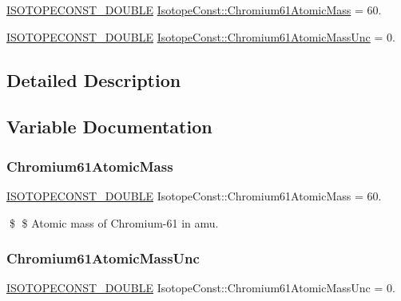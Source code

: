 \begin{DoxyCompactItemize}
\item 
\mbox{\hyperlink{group___isotope_const-_macros_ga8f45a7272ce02c0b4c65c44636ed719a}{I\+S\+O\+T\+O\+P\+E\+C\+O\+N\+S\+T\+\_\+\+D\+O\+U\+B\+LE}} \mbox{\hyperlink{group___isotope_const-_chromium-_cr61_gaf59b16d828f79b27686479916824b498}{Isotope\+Const\+::\+Chromium61\+Atomic\+Mass}} = 60.
\item 
\mbox{\hyperlink{group___isotope_const-_macros_ga8f45a7272ce02c0b4c65c44636ed719a}{I\+S\+O\+T\+O\+P\+E\+C\+O\+N\+S\+T\+\_\+\+D\+O\+U\+B\+LE}} \mbox{\hyperlink{group___isotope_const-_chromium-_cr61_gac6e155db97d61111004ffea47a38f279}{Isotope\+Const\+::\+Chromium61\+Atomic\+Mass\+Unc}} = 0.
\end{DoxyCompactItemize}


\subsection{Detailed Description}


\subsection{Variable Documentation}
\mbox{\label{group___isotope_const-_chromium-_cr61_gaf59b16d828f79b27686479916824b498}} 
\subsubsection{\texorpdfstring{Chromium61\+Atomic\+Mass}{Chromium61AtomicMass}}
{\footnotesize\ttfamily \mbox{\hyperlink{group___isotope_const-_macros_ga8f45a7272ce02c0b4c65c44636ed719a}{I\+S\+O\+T\+O\+P\+E\+C\+O\+N\+S\+T\+\_\+\+D\+O\+U\+B\+LE}} Isotope\+Const\+::\+Chromium61\+Atomic\+Mass = 60.}

\$ \$ Atomic mass of Chromium-\/61 in amu. \mbox{\label{group___isotope_const-_chromium-_cr61_gac6e155db97d61111004ffea47a38f279}} 
\subsubsection{\texorpdfstring{Chromium61\+Atomic\+Mass\+Unc}{Chromium61AtomicMassUnc}}
{\footnotesize\ttfamily \mbox{\hyperlink{group___isotope_const-_macros_ga8f45a7272ce02c0b4c65c44636ed719a}{I\+S\+O\+T\+O\+P\+E\+C\+O\+N\+S\+T\+\_\+\+D\+O\+U\+B\+LE}} Isotope\+Const\+::\+Chromium61\+Atomic\+Mass\+Unc = 0.}

